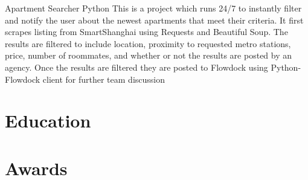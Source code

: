 \documentclass[11pt,a4paper]{moderncv}
\begin{document}



\vspace*{0.2\baselineskip}
\cventry{}
{Apartment Searcher}
{Python}
{}{}
{
This is a project which runs 24/7 to instantly filter and notify the user about the newest apartments that meet their criteria. It first scrapes listing from SmartShanghai using Requests and Beautiful Soup. The results are filtered to include location, proximity to requested metro stations, price, number of roommates, and whether or not the results are posted by an agency. Once the results are filtered they are posted to Flowdock using Python-Flowdock client for further team discussion
}

\section{Education}

\section{Awards}


\end{document}

